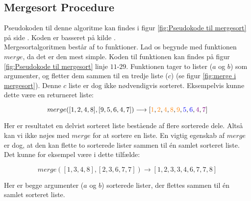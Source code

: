 \subsection{Mergesort Procedure}%
\label{sub:Mergesort Procedure}

Pseudokoden til denne algoritme kan findes i figur \ref{fig:Pseudokode til mergesort} på side \pageref{fig:Pseudokode til mergesort}. Koden er basseret på kilde \cite[s. 106]{aogd}.\\

Mergesortalgoritmen består af to funktioner. Lad os begynde med funktionen $merge$, da det er den mest simple. Koden til funktionen kan findes på figur \ref{fig:Pseudokode til mergesort} linje $11$-$29$. Funktionen tager to lister ($a$ og $b$) som argumenter, og fletter dem sammen til en tredje liste ($c$) (se figur \ref{fig:merge i mergesort}). Denne $c$ liste er dog ikke nødvendigvis sorteret. Eksempelvis kunne dette være en returneret liste:

$$merge([1,2,4,8],[9,5,6,4,7]) \longrightarrow [\color{orange}1\color{black}, \color{orange}2\color{black}, \color{orange}4\color{black}, \color{orange}8\color{black}, \color{orange}9\color{black}, \color{blue}5\color{black}, \color{blue}6\color{black}, \color{violet}4\color{black}, \color{violet}7\color{black}]$$

Her er resultatet en delvist sorteret liste bestående af flere sorterede dele. Altså kan vi ikke nøjes med $merge$ for at sortere en liste. En vigtig egenskab af $merge$ er dog, at den kan flette to sorterede lister sammen til én samlet sorteret liste. Det kunne for eksempel være i dette tilfælde:

$$merge([1,3,4,8],[2,3,6,7,7]) \longrightarrow [1, 2, 3, 3, 4, 6, 7, 7, 8]$$

Her er begge argumenter ($a$ og $b$) sorterede lister, der flettes sammen til én samlet sorteret liste.\\


